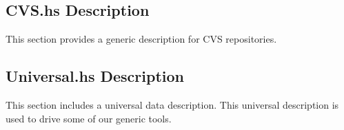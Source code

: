 

\newpage

\subsection{CVS.hs Description}

This section provides a generic description for CVS repositories.



\subsection{Universal.hs Description}

This section includes a universal data description.  This universal description
is used to drive some of our generic tools.







